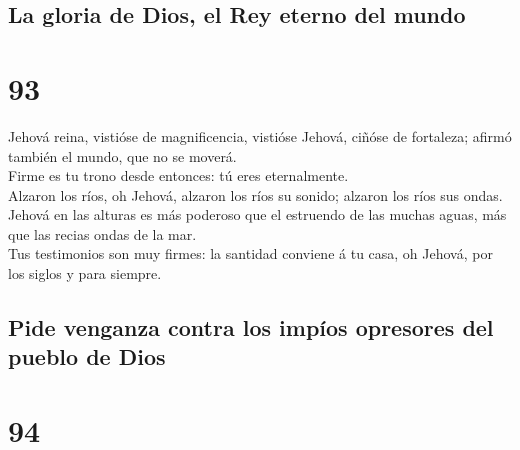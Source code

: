 \hypertarget{la-gloria-de-dios-el-rey-eterno-del-mundo}{%
\subsection{La gloria de Dios, el Rey eterno del
mundo}\label{la-gloria-de-dios-el-rey-eterno-del-mundo}}

\hypertarget{section-92}{%
\section{93}\label{section-92}}

 Jehová reina, vistióse de magnificencia, vistióse Jehová,
ciñóse de fortaleza; afirmó también el mundo, que no se moverá.\\
 Firme es tu trono desde entonces: tú eres eternalmente.\\
 Alzaron los ríos, oh Jehová, alzaron los ríos su sonido;
alzaron los ríos sus ondas.\\
 Jehová en las alturas es más poderoso que el estruendo de
las muchas aguas, más que las recias ondas de la mar.\\
 Tus testimonios son muy firmes: la santidad conviene á tu
casa, oh Jehová, por los siglos y para siempre.

\hypertarget{pide-venganza-contra-los-impuxedos-opresores-del-pueblo-de-dios}{%
\subsection{Pide venganza contra los impíos opresores del pueblo de
Dios}\label{pide-venganza-contra-los-impuxedos-opresores-del-pueblo-de-dios}}

\hypertarget{section-93}{%
\section{94}\label{section-93}}

